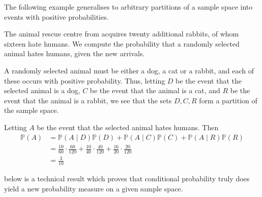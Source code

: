 The following example generalises  to arbitrary partitions of a sample space into events with positive probabilities.

\begin{example}
\label{exAnimalRescueCatsDogsRabbits}
The animal rescue centre from  acquires twenty additional rabbits, of whom sixteen hate humans. We compute the probability that a randomly selected animal hates humans, given the new arrivals.

A randomly selected animal must be either a dog, a cat or a rabbit, and each of these occurs with positive probability. Thus, letting $D$ be the event that the selected animal is a dog, $C$ be the event that the animal is a cat, and $R$ be the event that the animal is a rabbit, we see that the sets $D,C,R$ form a partition of the sample space.

Letting $A$ be the event that the selected animal hates humans. Then
\begin{align*}
\mathbb{P}(A) &= \mathbb{P}(A \mid D) \mathbb{P}(D) + \mathbb{P}(A \mid C) \mathbb{P}(C) + \mathbb{P}(A \mid R) \mathbb{P}(R) \\
&= \frac{10}{60} \cdot \frac{60}{120} + \frac{10}{40} \cdot \frac{40}{120} + \frac{16}{20} \cdot \frac{20}{120} \\
&= \frac{3}{10}
\end{align*}
\end{example}

 below is a technical result which proves that conditional probability truly does yield a new probability measure on a given sample space.

